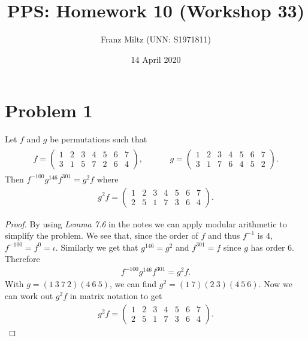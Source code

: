 \documentclass{article}
\title{PPS: Homework 10 (Workshop 33)}
\author{Franz Miltz (UNN: S1971811)}
\date{14 April 2020}
\begin{document}
\maketitle
\section*{Problem 1}
\begin{claim}
  Let $f$ and $g$ be permutations such that
  \begin{align*}
    \begin{aligned}
      f = \begin{pmatrix}
        1 & 2 & 3 & 4 & 5 & 6 & 7 \\
        3 & 1 & 5 & 7 & 2 & 6 & 4
      \end{pmatrix},
    \end{aligned}
    \hspace{1cm}
    \begin{aligned}
      g = \begin{pmatrix}
        1 & 2 & 3 & 4 & 5 & 6 & 7 \\
        3 & 1 & 7 & 6 & 4 & 5 & 2
      \end{pmatrix}.
    \end{aligned}
  \end{align*}
  Then $f^{-100}g^{146}f^{301}=g^2f$ where
  \begin{align*}
    g^2f=\begin{pmatrix}
      1 & 2 & 3 & 4 & 5 & 6 & 7 \\
      2 & 5 & 1 & 7 & 3 & 6 & 4
    \end{pmatrix}.
  \end{align*}
\end{claim}
\begin{proof}
  By using \emph{Lemma 7.6} in the notes we can apply modular arithmetic to simplify the problem.
  We see that, since the order of $f$ and thus $f^{-1}$ is $4$, $f^{-100} = f^{0} = \iota$.
  Similarly we get that $g^{146}=g^2$ and $f^{301}=f$ since $g$ has order $6$. Therefore
  \begin{align*}
    f^{-100}g^{146}f^{301}=g^2f.
  \end{align*}
  With $g=(1\:3\:7\:2)(4\:6\:5)$, we can find $g^2=(1\:7)(2\:3)(4\:5\:6)$. Now we can work out $g^2f$ in matrix notation to get
  \begin{align*}
    g^2f=\begin{pmatrix}
      1 & 2 & 3 & 4 & 5 & 6 & 7 \\
      2 & 5 & 1 & 7 & 3 & 6 & 4
    \end{pmatrix}.
  \end{align*}
\end{proof}
\end{document}
